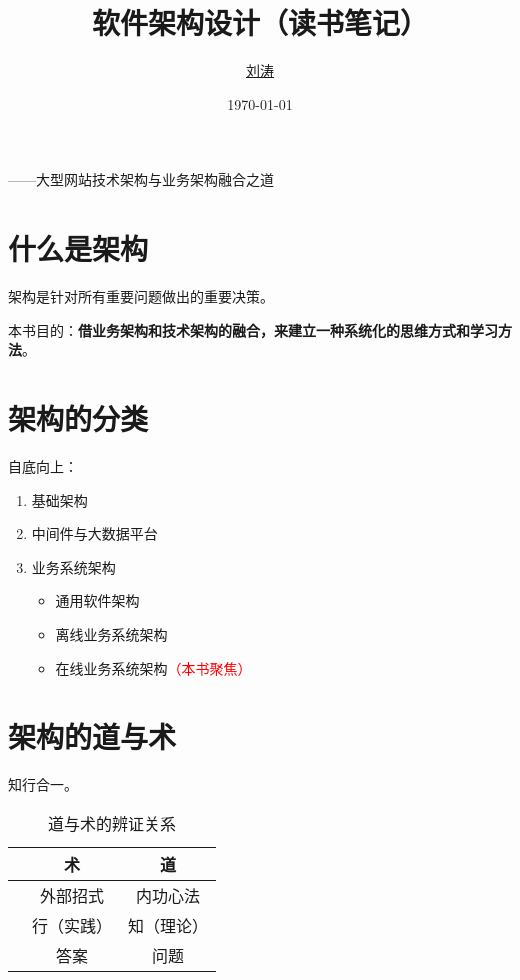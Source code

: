 \documentclass[cn,normal,11pt]{../elegantnote}
\title{软件架构设计（读书笔记）}
\author{\href{https://github.com/lightjameslyy/}{刘涛}}
\institute{中科院计算所}
\date{\today}
\begin{document}
\maketitle


——大型网站技术架构与业务架构融合之道

\section*{什么是架构}
\begin{definition}[架构]
   架构是针对所有重要问题做出的重要决策。
\end{definition}

本书目的：\textbf{借业务架构和技术架构的融合，来建立一种系统化的思维方式和学习方法}。

\section{架构的分类}
自底向上：
\begin{enumerate}
   \item 基础架构
   \item 中间件与大数据平台
   \item 业务系统架构
      \begin{itemize}
         \item 通用软件架构
         \item 离线业务系统架构
         \item 在线业务系统架构\textcolor{red}{（本书聚焦）}
      \end{itemize}
\end{enumerate}

\section{架构的道与术}
知行合一。

\begin{table}[htbp]
  \small
  \centering
  \caption{道与术的辨证关系}
    \begin{tabular}{lc|c}
    \toprule
                    &       术            &          道        \\
    \midrule
                    &     外部招式        &      内功心法      \\
                    &     行（实践）      &      知（理论）    \\
                    &       答案          &        问题        \\
    \bottomrule
    \end{tabular}%
  \label{tab:reg}%
\end{table}%
\end{document}
